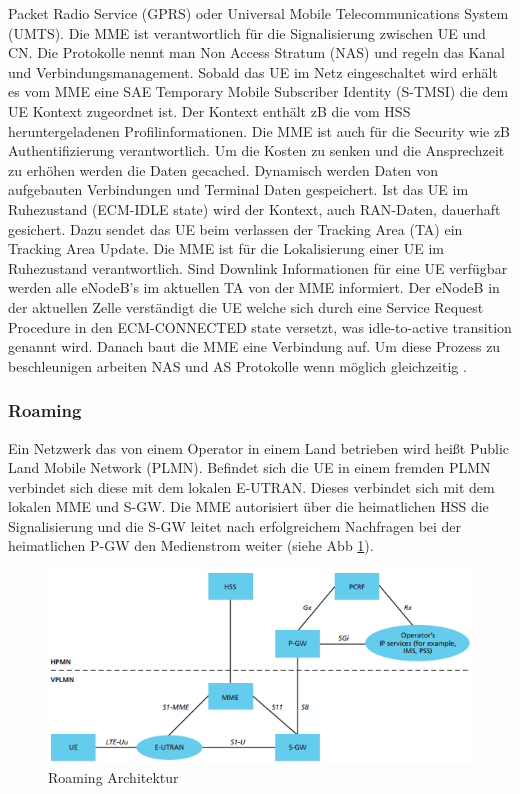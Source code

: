 Packet Radio Service (GPRS) oder Universal Mobile Telecommunications System (UMTS). Die MME ist verantwortlich für die Signalisierung zwischen UE und CN. Die Protokolle nennt man Non Access Stratum (NAS) und regeln das Kanal und Verbindungsmanagement. Sobald das UE im Netz eingeschaltet wird erhält es vom MME eine SAE Temporary Mobile Subscriber Identity (S-TMSI) die dem UE Kontext zugeordnet ist. Der Kontext enthält zB die vom HSS heruntergeladenen Profilinformationen. Die MME ist auch für die Security wie zB Authentifizierung verantwortlich. Um die Kosten zu senken und die Ansprechzeit zu erhöhen werden die Daten gecached. Dynamisch werden Daten von aufgebauten Verbindungen und Terminal Daten gespeichert. Ist das UE im Ruhezustand (ECM-IDLE state) wird der Kontext, auch RAN-Daten, dauerhaft gesichert. Dazu sendet das UE beim verlassen der Tracking Area (TA) ein Tracking Area Update. Die MME ist für die Lokalisierung einer UE im Ruhezustand verantwortlich. Sind Downlink Informationen für eine UE verfügbar werden alle eNodeB's im aktuellen TA von der MME informiert. Der eNodeB in der aktuellen Zelle verständigt die UE welche sich durch eine Service Request Procedure in den ECM-CONNECTED state versetzt, was idle-to-active transition genannt wird. Danach baut die MME eine Verbindung auf. Um diese Prozess zu beschleunigen arbeiten NAS und AS Protokolle wenn möglich gleichzeitig \cite{Ses11}.
\subsubsection{Roaming}
\label{subsubsec:etxterne}
Ein Netzwerk das von einem Operator in einem Land betrieben wird heißt Public Land Mobile Network (PLMN). Befindet sich die UE in einem fremden PLMN verbindet sich diese mit dem lokalen E-UTRAN. Dieses verbindet sich mit dem lokalen MME und S-GW. Die MME autorisiert über die heimatlichen HSS die Signalisierung und die S-GW leitet nach erfolgreichem Nachfragen bei der heimatlichen P-GW den Medienstrom weiter (siehe Abb \ref*{fig:roaming}).
\begin{figure}[H]
	\centering
	\includegraphics[width=1\linewidth]{images/Roaming}
	\caption{Roaming Architektur \protect\cite{Ses11}}
	\label{fig:roaming}
\end{figure}

